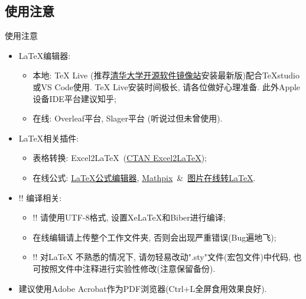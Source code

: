 \documentclass[hyperref,UTF8,11pt,CJK]{beamer}
\begin{document}
\subsection{使用注意}
\begin{frame}{使用注意}
	\begin{itemize}
		\item<1-> \LaTeX 编辑器:
		\begin{itemize}
			\item<1-> 本地: TeX Live (推荐\href{https://mirrors.tuna.tsinghua.edu.cn/CTAN/systems/texlive/Images/}{\color{BSblue}清华大学开源软件镜像站}安装最新版)配合TeXstudio或VS Code使用. TeX Live安装时间极长, 请各位做好心理准备. 此外Apple设备IDE平台建议知乎;
			\item<1-> 在线: Overleaf平台, Slager平台 (听说过但未曾使用).
		\end{itemize}
		\item<2-> \LaTeX 相关插件:
		\begin{itemize}
			\item<2-> 表格转换: Excel2\LaTeX~(\href{https://www.ctan.org/tex-archive/support/excel2latex/}{\color{BSblue}CTAN Excel2\LaTeX});
			\item<2-> 在线公式: \href{https://www.latexlive.com/}{\color{BSblue}LaTeX公式编辑器}, \href{https://mathpix.com/}{\color{BSblue}
				Mathpix}~\&~\href{https://mathf.itewqq.cn/}{\color{BSblue}图片在线转LaTeX}.
		\end{itemize}
		\item<3-> \color{JXred}!! 编译相关:
		\begin{itemize}
			\item<3-> \color{JXred}!! 请使用UTF-8格式, 设置XeLaTeX和Biber进行编译;
			\item<3-> 在线编辑请上传整个工作文件夹, 否则会出现严重错误(Bug遍地飞);
			\item<3-> \color{JXred}!! 对\LaTeX{} 不熟悉的情况下, 请勿轻易改动".sty"文件(宏包文件)中代码, 也可按照文件中注释进行实验性修改(注意保留备份).
		\end{itemize}
		\item<4-> \color{JXred} 建议使用Adobe Acrobat作为PDF浏览器(Ctrl+L全屏食用效果良好).
	\end{itemize}
\end{frame}
\end{document}
